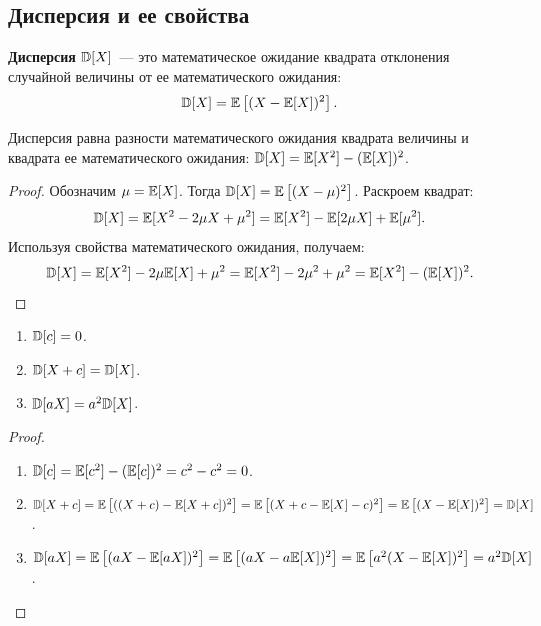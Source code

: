 \subsection{Дисперсия и ее свойства}

\begin{definition}
\textbf{Дисперсия} $\mathbb{D}[X]$~--- это математическое ожидание квадрата отклонения случайной величины от ее математического ожидания:
\[
\mathbb{D}[X] = \mathbb{E}\left[(X - \mathbb{E}[X])^2\right].
\]
\end{definition}

\begin{theorem}
Дисперсия равна разности математического ожидания квадрата величины и квадрата ее математического ожидания: $\mathbb{D}[X] = \mathbb{E}[X^2] - (\mathbb{E}[X])^2$.
\end{theorem}

\begin{proof}
Обозначим $\mu = \mathbb{E}[X]$. Тогда $\mathbb{D}[X] = \mathbb{E}\left[(X - \mu)^2\right]$. Раскроем квадрат:
\[
\mathbb{D}[X] = \mathbb{E}[X^2 - 2\mu X + \mu^2] = \mathbb{E}[X^2] - \mathbb{E}[2\mu X] + \mathbb{E}[\mu^2].
\]
Используя свойства математического ожидания, получаем:
\[
\mathbb{D}[X] = \mathbb{E}[X^2] - 2\mu \mathbb{E}[X] + \mu^2 = \mathbb{E}[X^2] - 2\mu^2 + \mu^2 = \mathbb{E}[X^2] - (\mathbb{E}[X])^2.
\]
\end{proof}

\begin{theorem}\label{thm:var_properties}
\begin{enumerate}
\item $\mathbb{D}[c] = 0$.
\item $\mathbb{D}[X + c] = \mathbb{D}[X]$.
\item $\mathbb{D}[aX] = a^2 \mathbb{D}[X]$.
\end{enumerate}
\end{theorem}

\begin{proof}
\begin{enumerate}
\item $\mathbb{D}[c] = \mathbb{E}[c^2] - (\mathbb{E}[c])^2 = c^2 - c^2 = 0$. 
\item $\mathbb{D}[X + c] = \mathbb{E}\left[((X+c) - \mathbb{E}[X+c])^2\right] = \mathbb{E}\left[(X + c - \mathbb{E}[X] - c)^2\right] = \mathbb{E}\left[(X - \mathbb{E}[X])^2\right] = \mathbb{D}[X]$. 
\item $\mathbb{D}[aX] = \mathbb{E}\left[(aX - \mathbb{E}[aX])^2\right] = \mathbb{E}\left[(aX - a\mathbb{E}[X])^2\right] = \mathbb{E}\left[a^2 (X - \mathbb{E}[X])^2\right] = a^2 \mathbb{D}[X]$.
\end{enumerate}
\end{proof}

